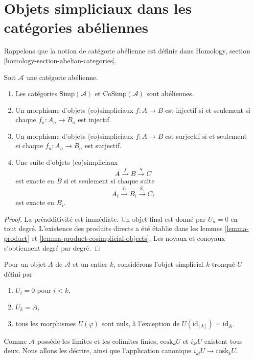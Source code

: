\section{Objets simpliciaux dans les catégories abéliennes}
\label{section-abelian}

\noindent
Rappelons que la notion de catégorie abélienne est définie dans Homology,
section \ref{homology-section-abelian-categories}.

\begin{lemma}
\label{lemma-abelian}
Soit $\mathcal{A}$ une catégorie abélienne.
\begin{enumerate}
\item Les catégories $\text{Simp}(\mathcal{A})$ et
$\text{CoSimp}(\mathcal{A})$ sont abéliennes.
\item Un morphisme d'objets (co)simpliciaux $f : A \to B$ est injectif
si et seulement si chaque $f_n : A_n \to B_n$ est injectif.
\item Un morphisme d'objets (co)simpliciaux $f : A \to B$ est surjectif
si et seulement si chaque $f_n : A_n \to B_n$ est surjectif.
\item Une suite d'objets (co)simpliciaux
$$
A \xrightarrow{f} B \xrightarrow{g} C
$$
est exacte en $B$ si et seulement si chaque suite
$$
A_i \xrightarrow{f_i} B_i \xrightarrow{g_i} C_i
$$
est exacte en $B_i$.
\end{enumerate}
\end{lemma}

\begin{proof}
La préadditivité est immédiate. Un objet final est donné par
$U_n = 0$ en tout degré. L'existence des produits directs a été établie
dans les lemmes \ref{lemma-product} et
\ref{lemma-product-cosimplicial-objects}. Les noyaux et conoyaux
s'obtiennent degré par degré.
\end{proof}

\noindent
Pour un objet $A$ de $\mathcal{A}$ et un entier $k$, considérons l'objet
simplicial $k$-tronqué $U$ défini par
\begin{enumerate}
\item $U_i = 0$ pour $i < k$,
\item $U_k = A$,
\item tous les morphismes $U(\varphi)$ sont nuls, à l'exception de
$U(\text{id}_{[k]}) = \text{id}_A$.
\end{enumerate}
Comme $\mathcal{A}$ possède les limites et les colimites finies,
$\text{cosk}_k U$ et $i_{k!}U$ existent tous deux. Nous allons les
décrire, ainsi que l'application canonique
$i_{k!}U \to \text{cosk}_kU$.


